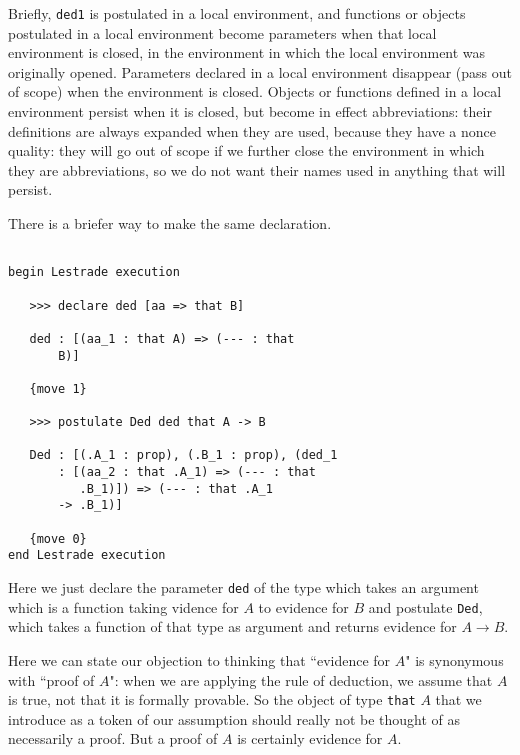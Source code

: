 \documentclass[12pt]{article}
\begin{document}
Briefly, {\tt ded1} is postulated in a local environment, and functions or objects postulated in a local environment
become parameters when that local environment is closed, in the environment in which the local environment was originally opened.  Parameters declared in a local environment disappear (pass out of scope) when the environment is closed.  Objects or functions defined in a local environment persist when it is closed, but become in effect abbreviations:  their definitions are always expanded when they are used, because they have a nonce quality:  they will go out of scope if we further close the environment in which they are abbreviations, so we do not want their names used in anything that will persist.

There is a briefer way to make the same declaration.

\begin{verbatim}

begin Lestrade execution

   >>> declare ded [aa => that B]

   ded : [(aa_1 : that A) => (--- : that 
       B)]

   {move 1}

   >>> postulate Ded ded that A -> B

   Ded : [(.A_1 : prop), (.B_1 : prop), (ded_1 
       : [(aa_2 : that .A_1) => (--- : that 
          .B_1)]) => (--- : that .A_1 
       -> .B_1)]

   {move 0}
end Lestrade execution

\end{verbatim}

Here we just declare the parameter {\tt ded} of the type which takes an argument which is a function taking vidence for $A$ to evidence for $B$ and postulate {\tt Ded}, which takes a function of that type as argument and returns evidence for $A \rightarrow B$.

Here we can state our objection to thinking that ``evidence for $A$" is synonymous with ``proof of $A$":  when we are applying the rule of deduction, we assume that $A$ is  true, not that it is formally provable.  So the object of type {\tt that} $A$ that we introduce as a token of our assumption should really not be thought of as necessarily a proof.  But a proof of $A$ is certainly evidence for $A$.
\end{document}
